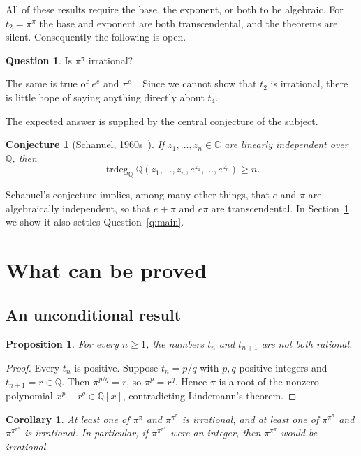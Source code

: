 \documentclass[11pt]{amsart}
\newtheorem{proposition}[theorem]{Proposition}
\newtheorem{corollary}[theorem]{Corollary}
\newtheorem{conjecture}[theorem]{Conjecture}
\theoremstyle{definition}
\newtheorem{question}[theorem]{Question}
\theoremstyle{remark}
\newcommand{\Q}{\mathbb{Q}}
\newcommand{\C}{\mathbb{C}}
\DeclareMathOperator{\trdeg}{trdeg}
\begin{document}
All of these results require the base, the exponent, or both to be algebraic. For $t_2 = \pi^{\pi}$ the base and exponent are both transcendental, and the theorems are silent. Consequently the following is open.

\begin{question}
Is $\pi^{\pi}$ irrational?
\end{question}

The same is true of $e^{e}$ and $\pi^{e}$~\cite{proofwiki}. Since we cannot show that $t_2$ is irrational, there is little hope of saying anything directly about $t_4$.

The expected answer is supplied by the central conjecture of the subject.

\begin{conjecture}[Schanuel, 1960s~\cite{lang}]\label{conj:schanuel}
If $z_1, \ldots, z_n \in \C$ are linearly independent over $\Q$, then
\[
\trdeg_{\Q} \Q(z_1, \ldots, z_n, e^{z_1}, \ldots, e^{z_n}) \ge n.
\]
\end{conjecture}

Schanuel's conjecture implies, among many other things, that $e$ and $\pi$ are algebraically independent, so that $e+\pi$ and $e\pi$ are transcendental. In Section~\ref{sec:positive} we show it also settles Question~\ref{q:main}.

\section{What can be proved}\label{sec:positive}

\subsection{An unconditional result}

\begin{proposition}\label{prop:consecutive}
For every $n \ge 1$, the numbers $t_n$ and $t_{n+1}$ are not both rational.
\end{proposition}

\begin{proof}
Every $t_n$ is positive. Suppose $t_n = p/q$ with $p, q$ positive integers and $t_{n+1} = r \in \Q$. Then $\pi^{p/q} = r$, so $\pi^{p} = r^{q}$. Hence $\pi$ is a root of the nonzero polynomial $x^{p} - r^{q} \in \Q[x]$, contradicting Lindemann's theorem.
\end{proof}

\begin{corollary}
At least one of $\pi^{\pi}$ and $\pi^{\pi^{\pi}}$ is irrational, and at least one of $\pi^{\pi^{\pi}}$ and $\pi^{\pi^{\pi^{\pi}}}$ is irrational. In particular, if $\pi^{\pi^{\pi^{\pi}}}$ were an integer, then $\pi^{\pi^{\pi}}$ would be irrational.
\end{corollary}
\end{document}
